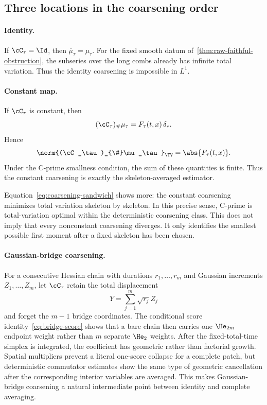 \subsection{Three locations in the coarsening order}

\paragraph{Identity.}
If $\cC_\tau=\Id$, then $\overline\mu_\tau=\mu_\tau$. For the fixed smooth datum of~\cref{thm:raw-faithful-obstruction}, the subseries over the long combs already has infinite total variation. Thus the identity coarsening is impossible in $L^1$.

\paragraph{Constant map.}
If $\cC_\tau$ is constant, then
\begin{equation*}
  (\cC_\tau)_{\#}\mu_\tau
  =
  F_\tau(t,x)\,\delta_*.
\end{equation*}
Hence
\begin{equation*}
  \norm{(\cC_\tau)_{\#}\mu_\tau}_{\TV}
  =
  \abs{F_\tau(t,x)}.
\end{equation*}
Under the C-prime smallness condition, the sum of these quantities is finite. Thus the constant coarsening is exactly the skeleton-averaged estimator.

Equation~\eqref{eq:coarsening-sandwich} shows more: the constant coarsening minimizes total variation skeleton by skeleton. In this precise sense, C-prime is total-variation optimal within the deterministic coarsening class. This does not imply that every nonconstant coarsening diverges. It only identifies the smallest possible first moment after a fixed skeleton has been chosen.

\paragraph{Gaussian-bridge coarsening.}
For a consecutive Hessian chain with durations $r_1,\ldots,r_m$ and Gaussian increments $Z_1,\ldots,Z_m$, let $\cC_\tau$ retain the total displacement
\begin{equation*}
  Y=\sum_{j=1}^m\sqrt{r_j}Z_j
\end{equation*}
and forget the $m-1$ bridge coordinates. The conditional score identity~\eqref{eq:bridge-score} shows that a bare chain then carries one $\He_{2m}$ endpoint weight rather than $m$ separate $\He_2$ weights. After the fixed-total-time simplex is integrated, the coefficient has geometric rather than factorial growth. Spatial multipliers prevent a literal one-score collapse for a complete patch, but deterministic commutator estimates show the same type of geometric cancellation after the corresponding interior variables are averaged. This makes Gaussian-bridge coarsening a natural intermediate point between identity and complete averaging.

